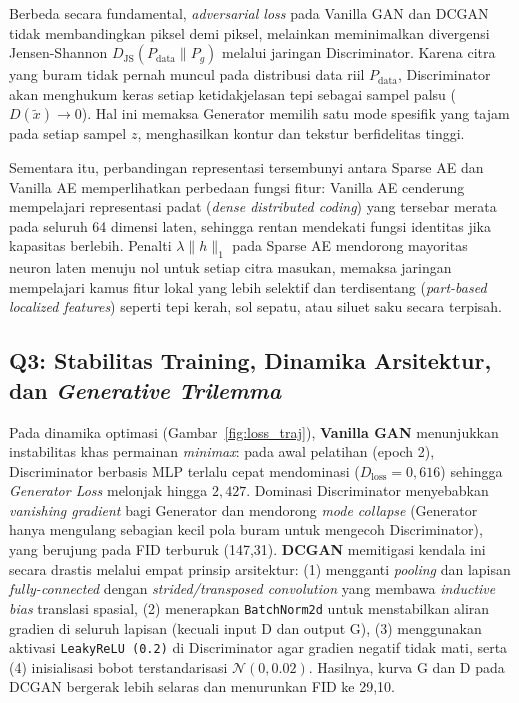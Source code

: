 \documentclass[11pt,a4paper]{article}
\begin{document}
Berbeda secara fundamental, \textit{adversarial loss} pada Vanilla GAN dan DCGAN tidak membandingkan piksel demi piksel, melainkan meminimalkan divergensi Jensen-Shannon $D_{\text{JS}}(P_{\text{data}} \| P_g)$ melalui jaringan Discriminator. Karena citra yang buram tidak pernah muncul pada distribusi data riil $P_{\text{data}}$, Discriminator akan menghukum keras setiap ketidakjelasan tepi sebagai sampel palsu ($D(\tilde{x}) \rightarrow 0$). Hal ini memaksa Generator memilih satu mode spesifik yang tajam pada setiap sampel $z$, menghasilkan kontur dan tekstur berfidelitas tinggi.

Sementara itu, perbandingan representasi tersembunyi antara Sparse AE dan Vanilla AE memperlihatkan perbedaan fungsi fitur: Vanilla AE cenderung mempelajari representasi padat (\textit{dense distributed coding}) yang tersebar merata pada seluruh 64 dimensi laten, sehingga rentan mendekati fungsi identitas jika kapasitas berlebih. Penalti $\lambda \|h\|_1$ pada Sparse AE mendorong mayoritas neuron laten menuju nol untuk setiap citra masukan, memaksa jaringan mempelajari kamus fitur lokal yang lebih selektif dan terdisentang (\textit{part-based localized features}) seperti tepi kerah, sol sepatu, atau siluet saku secara terpisah.

\subsection{Q3: Stabilitas Training, Dinamika Arsitektur, dan \textit{Generative Trilemma}}
Pada dinamika optimasi (Gambar~\ref{fig:loss_traj}), \textbf{Vanilla GAN} menunjukkan instabilitas khas permainan \textit{minimax}: pada awal pelatihan (epoch 2), Discriminator berbasis MLP terlalu cepat mendominasi ($D_{\text{loss}} = 0,616$) sehingga \textit{Generator Loss} melonjak hingga $2,427$. Dominasi Discriminator menyebabkan \textit{vanishing gradient} bagi Generator dan mendorong \textit{mode collapse} (Generator hanya mengulang sebagian kecil pola buram untuk mengecoh Discriminator), yang berujung pada FID terburuk (147,31). \textbf{DCGAN} memitigasi kendala ini secara drastis melalui empat prinsip arsitektur: (1) mengganti \textit{pooling} dan lapisan \textit{fully-connected} dengan \textit{strided/transposed convolution} yang membawa \textit{inductive bias} translasi spasial, (2) menerapkan \texttt{BatchNorm2d} untuk menstabilkan aliran gradien di seluruh lapisan (kecuali input D dan output G), (3) menggunakan aktivasi \texttt{LeakyReLU (0.2)} di Discriminator agar gradien negatif tidak mati, serta (4) inisialisasi bobot terstandarisasi $\mathcal{N}(0, 0.02)$. Hasilnya, kurva G dan D pada DCGAN bergerak lebih selaras dan menurunkan FID ke 29,10.
\end{document}
